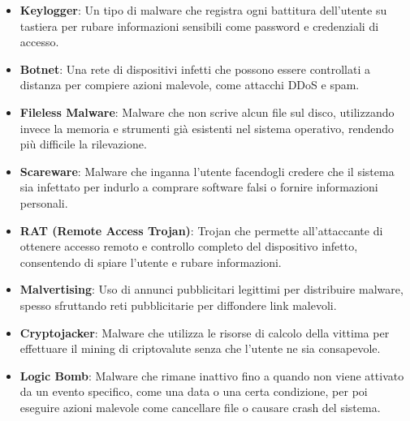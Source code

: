 \begin{itemize}
    \item \textbf{Keylogger}: Un tipo di malware che registra ogni battitura dell'utente su tastiera per rubare informazioni sensibili come password e credenziali di accesso.
    \item \textbf{Botnet}: Una rete di dispositivi infetti che possono essere controllati a distanza per compiere azioni malevole, come attacchi DDoS e spam.
    \item \textbf{Fileless Malware}: Malware che non scrive alcun file sul disco, utilizzando invece la memoria e strumenti già esistenti nel sistema operativo, rendendo più difficile la rilevazione.
    \item \textbf{Scareware}: Malware che inganna l'utente facendogli credere che il sistema sia infettato per indurlo a comprare software falsi o fornire informazioni personali.
    \item \textbf{RAT (Remote Access Trojan)}: Trojan che permette all'attaccante di ottenere accesso remoto e controllo completo del dispositivo infetto, consentendo di spiare l'utente e rubare informazioni.
    \item \textbf{Malvertising}: Uso di annunci pubblicitari legittimi per distribuire malware, spesso sfruttando reti pubblicitarie per diffondere link malevoli.
    \item \textbf{Cryptojacker}: Malware che utilizza le risorse di calcolo della vittima per effettuare il mining di criptovalute senza che l'utente ne sia consapevole.
    \item \textbf{Logic Bomb}: Malware che rimane inattivo fino a quando non viene attivato da un evento specifico, come una data o una certa condizione, per poi eseguire azioni malevole come cancellare file o causare crash del sistema.
\end{itemize}

